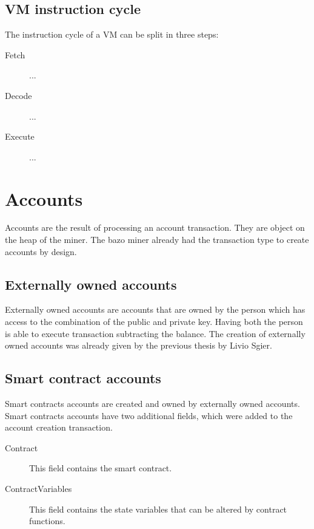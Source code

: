 \subsection{VM instruction cycle}
The instruction cycle of a VM can be split in three steps:
\begin{description}
  \item[Fetch] ...
  \item[Decode] ...
  \item[Execute] ...
\end{description}


\section{Accounts}
Accounts are the result of processing an account transaction. They are object on the heap of the miner. The bazo miner already had the transaction type to create accounts by design.

\subsection{Externally owned accounts}
Externally owned accounts are accounts that are owned by the person which has access to the combination of the public and private key. Having both the person is able to execute transaction subtracting the balance. The creation of externally owned accounts was already given by the previous thesis by Livio Sgier.

\subsection{Smart contract accounts}
Smart contracts accounts are created and owned by externally owned accounts. Smart contracts accounts have two additional fields, which were added to the account creation transaction.

\begin{description}
  \item[Contract] This field contains the smart contract.
  \item[ContractVariables] This field contains the state variables that can be altered by contract functions.
\end{description}

